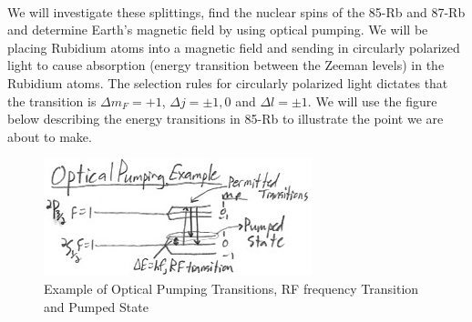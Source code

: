 \documentclass{article}
\begin{document}
    \\\indent We will investigate these splittings, find the nuclear spins of the 85-Rb and 87-Rb and determine Earth's magnetic field by using optical pumping. We will be placing Rubidium atoms into a magnetic field and sending in circularly polarized light to cause absorption (energy transition between the Zeeman levels) in the Rubidium atoms. The selection rules for circularly polarized light dictates that the transition is $\Delta m_F = +1$, $\Delta j = \pm1,0$ and $\Delta l = \pm1$. We will use the figure below describing the energy transitions in 85-Rb to illustrate the point we are about to make. 
    \begin{figure}[H] %
        \centering
        \includegraphics[scale = 0.5]{13.jpg}
        \caption{Example of Optical Pumping Transitions, RF frequency Transition and Pumped State}
        \label{fig:my_label}
    \end{figure}
\end{document}
